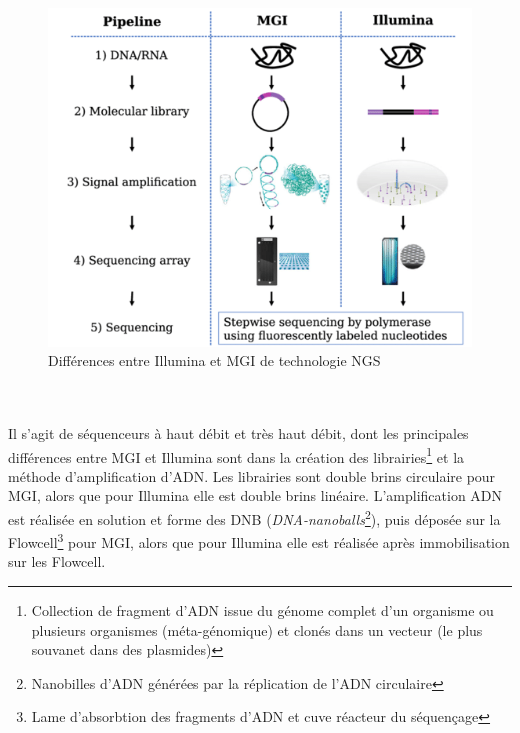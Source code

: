\begin{minipage}{0.45\textwidth}
	\begin{figure}[H]
        \centering
        \includegraphics[width=1\textwidth]{img/MGI_vs_Illumina.png}
        \caption{\footnotesize{Différences entre Illumina et MGI de technologie NGS}}
        \label{fig-Illu-vs-MGI}
    \end{figure}
\end{minipage}\\\\

    Il s'agit de séquenceurs à haut débit et très haut débit, dont les principales différences entre MGI et Illumina sont dans la création des librairies\footnote{Collection de fragment d'ADN issue du génome complet d'un organisme ou plusieurs organismes (méta-génomique) et clonés dans un vecteur (le plus souvanet dans des plasmides)} et la méthode d'amplification d'ADN. Les librairies sont double brins circulaire pour MGI, alors que pour Illumina elle est double brins linéaire. L'amplification ADN est réalisée en solution et forme des DNB (\emph{DNA-nanoballs}\footnote{Nanobilles d'ADN générées par la réplication de l'ADN circulaire}), puis déposée sur la Flowcell\footnote{Lame d'absorbtion des fragments d'ADN et cuve réacteur du séquençage} pour MGI, alors que pour Illumina elle est réalisée après immobilisation sur les Flowcell.

